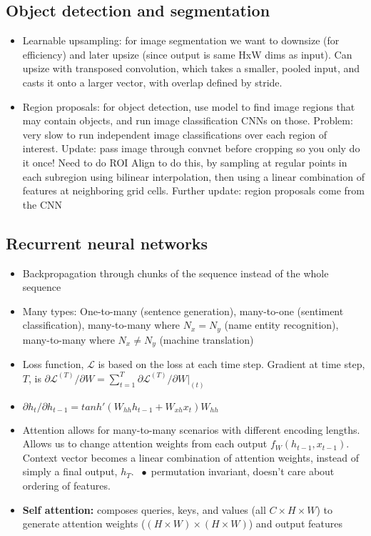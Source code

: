 \documentclass[9pt]{extarticle}
\newcommand*\bspace{$\; \bullet \;$}
\begin{document}
\subsection{Object detection and segmentation}
\begin{itemize}
    \item Learnable upsampling: for image segmentation we want to downsize (for efficiency) and later upsize (since output is same HxW dims as input). Can upsize with transposed convolution, which takes a smaller, pooled input, and casts it onto a larger vector, with overlap defined by stride. 
    \item Region proposals: for object detection, use model to find image regions that may contain objects, and run image classification CNNs on those. Problem: very slow to run independent image classifications over each region of interest. Update: pass image through convnet before cropping so you only do it once! Need to do ROI Align to do this, by sampling at regular points in each subregion using bilinear interpolation, then using a linear combination of features at neighboring grid cells. Further update: region proposals come from the CNN
\end{itemize}

\subsection{Recurrent neural networks}
\begin{itemize}
\item Backpropagation through chunks of the sequence instead of the whole sequence
\item Many types: One-to-many (sentence generation), many-to-one (sentiment classification), many-to-many where $N_x = N_y$ (name entity recognition), many-to-many where $N_x \neq N_y$ (machine translation)
\item Loss function, $\mathcal{L}$ is based on the loss at each time step. Gradient at time step, $T$, is $\partial\mathcal{L}^{(T)} / \partial W = \sum_{t=1}^T \partial\mathcal{L}^{(T)} / \partial W |_{(t)}$
\item $\partial h_t / \partial h_{t-1} = tanh'(W_{hh}h_{t-1} + W_{xh}x_t)W_{hh}$
\item Attention allows for many-to-many scenarios with different encoding lengths. Allows us to change attention weights from each output $f_W(h_{t-1}, x_{t-1})$. Context vector becomes a linear combination of attention weights, instead of simply a final output, $h_T$. \bspace permutation invariant, doesn't care about ordering of features.
\item \textbf{Self attention:} composes queries, keys, and values (all $C\times H \times W$) to generate attention weights ($(H\times W)\times(H\times W)$) and output features
\end{itemize}
\end{document}

